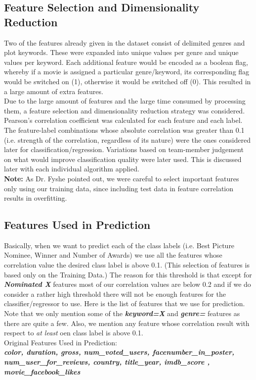 \documentclass[journal,transmag]{IEEEtran}
\begin{document}
\subsection{Feature Selection and Dimensionality Reduction}
Two of the features already given in the dataset consist of delimited genres and plot keywords. These were expanded into unique values per genre and unique values per keyword. Each additional feature would be encoded as a boolean flag, whereby if a movie is assigned a particular genre/keyword, its corresponding flag would be switched on (1), otherwise it would be switched off (0). This resulted in a large amount of extra features.\\
Due to the large amount of features and the large time consumed by processing them, a feature selection and dimensionality reduction strategy was considered. Pearson's correlation coefficient was calculated for each feature and each label. The feature-label combinations whose absolute correlation was greater than 0.1 (i.e. strength of the correlation, regardless of its nature) were the ones considered later for classification/regression. Variations based on team-member judgement on what would improve classification quality were later used. This is discussed later with each individual algorithm applied.\\
\textbf{Note:} As Dr. Fyshe pointed out, we were careful to select important features only using our training data, since including test data in feature correlation results in overfitting. \\

\subsection{Features Used in Prediction}
Basically, when we want to predict each of the class labels (i.e. Best Picture Nominee, Winner and Number of Awards) we use all the features whose correlation value the desired class label is above 0.1. (This selection of features is based only on the Training Data.) The reason for this threshold is that except for \textbf{\textit{Nominated X}} features most of our correlation values are below 0.2 and if we do consider a rather high threshold there will not be enough features for the classifier/regressor to use. Here is the list of features that we use for prediction. Note that we only mention some of the \textbf{\textit{keyword=X}} and \textbf{\textit{genre=}} features as there are quite a few. Also, we mention any feature whose correlation result with respect to \textit{at least} oen class label is above 0.1.\\
Original Features Used in Prediction:\\
\textit{\textbf{ color, duration,	gross,	num\_voted\_users, 	facenumber\_in\_poster,	num\_user\_for\_reviews,	country,	title\_year,	imdb\_score	, movie\_facebook\_likes}} \\
\end{document}
